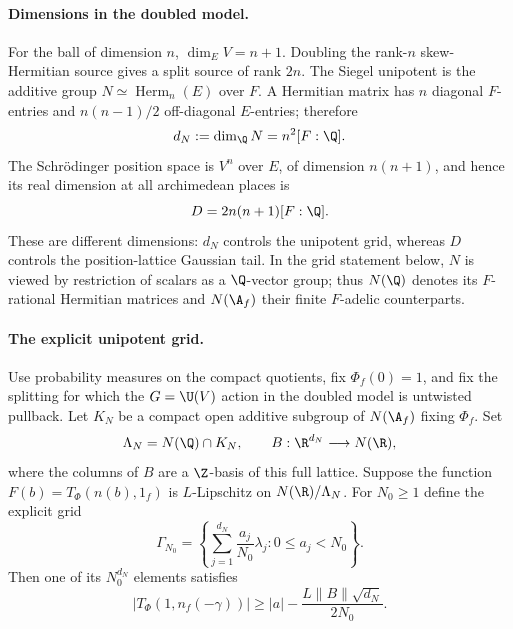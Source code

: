 \paragraph{Dimensions in the doubled model.}
For the ball of dimension $n$, $\dim_E V=n+1$. Doubling the
rank-$n$ skew-Hermitian source gives a split source of rank $2n$.
The Siegel unipotent is the additive group
$N\simeq\operatorname{Herm}_n(E)$ over $F$. A Hermitian matrix has
$n$ diagonal $F$-entries and $n(n-1)/2$ off-diagonal $E$-entries;
therefore
\[
 d_N:=\dim_\Q N=n^2[F:\Q].
\]
The Schr\"odinger position space is $V^n$ over $E$, of dimension
$n(n+1)$, and hence its real dimension at all archimedean places is
\[
 D=2n(n+1)[F:\Q].
\]
These are different dimensions: $d_N$ controls the unipotent grid,
whereas $D$ controls the position-lattice Gaussian tail.
In the grid statement below, $N$ is viewed by restriction of
scalars as a $\Q$-vector group; thus $N(\Q)$ denotes its
$F$-rational Hermitian matrices and $N(\A_f)$ their finite
$F$-adelic counterparts.

\paragraph{The explicit unipotent grid.}
Use probability measures on the compact quotients, fix
$\Phi_f(0)=1$, and fix the splitting for which the $G=\U(V)$
action in the doubled model is untwisted pullback. Let $K_N$ be
a compact open additive subgroup of $N(\A_f)$ fixing $\Phi_f$.
Set
\[
 \Lambda_N=N(\Q)\cap K_N,
 \qquad B:\R^{d_N}\longrightarrow N(\R),
\]
where the columns of $B$ are a $\Z$-basis of this full lattice.
Suppose the function
$F(b)=T_\Phi(n(b),1_f)$ is $L$-Lipschitz on
$N(\R)/\Lambda_N$. For $N_0\geq1$ define the explicit grid
\[
 \Gamma_{N_0}=
 \left\{\sum_{j=1}^{d_N}\frac{a_j}{N_0}\lambda_j:
                         0\leq a_j<N_0\right\}.
\]
Then one of its $N_0^{d_N}$ elements satisfies
\begin{equation}\label{Q10-grid}
 |T_\Phi(1,n_f(-\gamma))|
    \geq |a|-\frac{L\|B\|\sqrt{d_N}}{2N_0}.
\end{equation}

